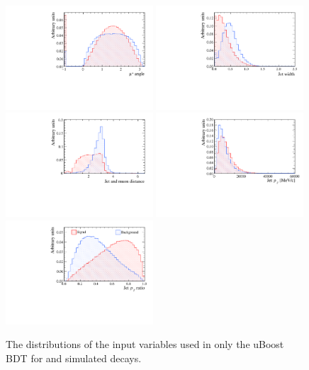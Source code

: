 \begin{figure}[htbp]
  \centering
    \includegraphics[width=0.49\textwidth]{./Figs/Appendix2/muon_angle.pdf}
    \includegraphics[width=0.49\textwidth]{./Figs/Appendix2/jet_width.pdf}
    \includegraphics[width=0.49\textwidth]{./Figs/Appendix2/jet_daugt_dist.pdf}
    \includegraphics[width=0.49\textwidth]{./Figs/Appendix2/jet_pt.pdf}
    \includegraphics[width=0.49\textwidth]{./Figs/Appendix2/jet_pt_ratio.pdf}
 
  \caption{The distributions of the input variables used in only the uBoost BDT for \bsmumu and  simulated decays.}
  \label{fig:myBDTvars}
\end{figure}




